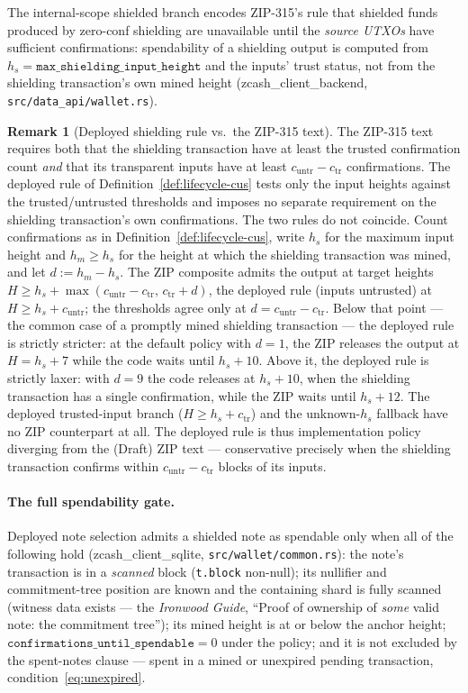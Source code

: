 \documentclass[11pt,a4paper]{article}
\theoremstyle{definition}
\newtheorem{remark}[theorem]{Remark}
\begin{document}
The internal-scope shielded branch encodes ZIP-315's rule that shielded
funds produced by zero-conf shielding are unavailable until the
\emph{source UTXOs} have sufficient confirmations: spendability of a
shielding output is computed from
$h_s = \mathtt{max\_shielding\_input\_height}$ and the inputs' trust
status, not from the shielding transaction's own mined height
(\textsf{zcash\_client\_backend}, \texttt{src/data\_api/wallet.rs}).

\begin{remark}[Deployed shielding rule vs.\ the ZIP-315 text]
\label{rem:lifecycle-shielding-divergence}
The ZIP-315 text requires both that the shielding transaction have at
least the trusted confirmation count \emph{and} that its transparent
inputs have at least $c_{\mathrm{untr}} - c_{\mathrm{tr}}$ confirmations.
The deployed rule of Definition~\ref{def:lifecycle-cus} tests only the
input heights against the trusted/untrusted thresholds and imposes no
separate requirement on the shielding transaction's own confirmations.
The two rules do not coincide. Count confirmations as in
Definition~\ref{def:lifecycle-cus}, write $h_s$ for the maximum input
height and $h_m \ge h_s$ for the height at which the shielding
transaction was mined, and let $d := h_m - h_s$. The ZIP composite
admits the output at target heights
$H \ge h_s + \max(c_{\mathrm{untr}} - c_{\mathrm{tr}},\,
c_{\mathrm{tr}} + d)$, the deployed rule (inputs untrusted) at
$H \ge h_s + c_{\mathrm{untr}}$; the thresholds agree only at
$d = c_{\mathrm{untr}} - c_{\mathrm{tr}}$. Below that point --- the
common case of a promptly mined shielding transaction --- the deployed
rule is strictly stricter: at the default policy with $d = 1$, the ZIP
releases the output at $H = h_s + 7$ while the code waits until
$h_s + 10$. Above it, the deployed rule is strictly laxer: with $d = 9$
the code releases at $h_s + 10$, when the shielding transaction has a
single confirmation, while the ZIP waits until $h_s + 12$. The deployed
trusted-input branch ($H \ge h_s + c_{\mathrm{tr}}$) and the
unknown-$h_s$ fallback have no ZIP counterpart at all. The deployed rule
is thus implementation policy diverging from the (Draft) ZIP text ---
conservative precisely when the shielding transaction confirms within
$c_{\mathrm{untr}} - c_{\mathrm{tr}}$ blocks of its inputs.
\end{remark}

\paragraph{The full spendability gate.} Deployed note selection admits a
shielded note as spendable only when all of the following hold
(\textsf{zcash\_client\_sqlite}, \texttt{src/wallet/common.rs}): the note's
transaction is in a \emph{scanned} block (\texttt{t.block} non-null); its
nullifier and commitment-tree position are known and the containing shard
is fully scanned (witness data exists --- the \emph{Ironwood Guide}, ``Proof
of ownership of \emph{some} valid note: the commitment tree''); its mined
height is at or below the anchor height;
$\texttt{confirmations\_until\_spendable} = 0$ under the policy; and it is
not excluded by the spent-notes clause --- spent in a mined or unexpired
pending transaction, condition~\eqref{eq:unexpired}.
\end{document}
